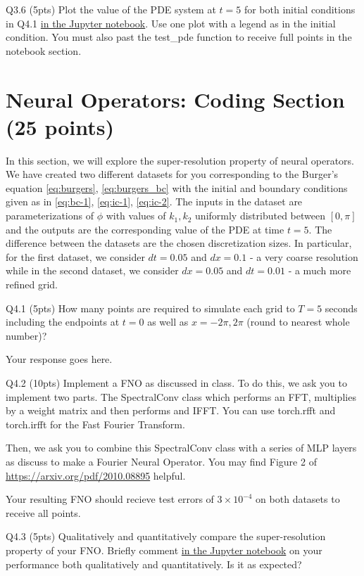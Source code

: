\documentclass[12pt,letterpaper, onecolumn]{exam}
\theoremstyle{definition}
\begin{document}
\color{orange} Q3.6 (5pts) \color{black} Plot the value of the PDE system at $t=5$ for both initial conditions in Q4.1 \underline{in the Jupyter notebook}. Use one plot with a legend as in the initial condition. You must also past the test\_pde function to receive full points in the notebook section. 
\color{black}


\section{Neural Operators: Coding Section (25 points)}
In this section, we will explore the super-resolution property of neural operators. 
We have created two different datasets for you corresponding to the Burger's equation \eqref{eq:burgers}, \eqref{eq:burgers_bc} with the initial and boundary conditions given as in \eqref{eq:bc-1}, \eqref{eq:ic-1}, \eqref{eq:ic-2}. The inputs in the dataset are parameterizations of $\phi$ with values of $k_1, k_2$ uniformly distributed between $[0, \pi]$ and the outputs are the corresponding value of the PDE at time $t=5$. The difference between the datasets are the chosen discretization sizes. In particular, for the first dataset, we consider $dt=0.05$ and $dx=0.1$ -  a very coarse resolution while in the second dataset, we consider $dx=0.05$ and $dt=0.01$ - a much more refined grid.

\color{orange} Q4.1 (5pts) \color{black} How many points are required to simulate each grid to $T = 5$ seconds including the endpoints at $t=0$ as well as $x=-2\pi, 2\pi$ (round to nearest whole number)? 
 \begin{tcolorbox}\centering
    Your response goes here. 
\end{tcolorbox}

\color{orange} Q4.2 (10pts) \color{black} Implement a FNO as discussed in class. To do this, we ask you to implement two parts. The SpectralConv class which performs an FFT, multiplies by a weight matrix and then performs and IFFT. You can use torch.rfft and torch.irfft for the Fast Fourier Transform. 

Then, we ask you to combine this SpectralConv class with a series of MLP layers as discuss to make a Fourier Neural Operator. You may find Figure 2 of \url{https://arxiv.org/pdf/2010.08895} helpful.  

Your resulting FNO should recieve test errors of $3 \times 10^{-4}$ on both datasets to receive all points. 

\color{orange} Q4.3 (5pts) \color{black} Qualitatively and quantitatively compare the super-resolution property of your FNO. Briefly comment \underline{in the Jupyter notebook} on your performance both qualitatively and quantitatively. Is it as expected? 
\end{document}
